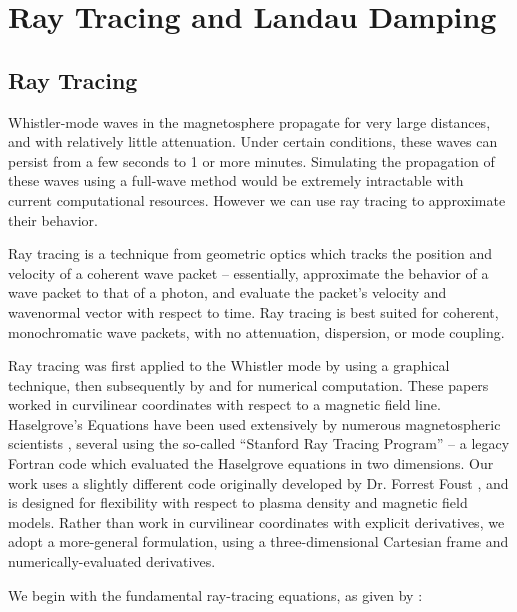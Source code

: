 \section{Ray Tracing and Landau Damping}
\label{section:raytracing}
\subsection{Ray Tracing}
Whistler-mode waves in the magnetosphere propagate for very large distances, and with relatively little attenuation. Under certain conditions, these waves can persist from a few seconds to 1 or more minutes. Simulating the propagation of these waves using a full-wave method would be extremely intractable with current computational resources. However we can use ray tracing to approximate their behavior.

Ray tracing is a technique from geometric optics which tracks the position and velocity of a coherent wave packet -- essentially, approximate the behavior of a wave packet to that of a photon, and evaluate the packet's velocity and wavenormal vector with respect to time. Ray tracing is best suited for coherent, monochromatic wave packets, with no attenuation, dispersion, or mode coupling. 

Ray tracing was first applied to the Whistler mode by \cite{Haselgrove1955} using a graphical technique, then subsequently by \cite{Haselgrove1960} and \cite{Kimura1966} for numerical computation. These papers worked in curvilinear coordinates with respect to a magnetic field line. Haselgrove's Equations have been used extensively by numerous magnetospheric scientists \citep{Kimura1966, Edgar1972, Ngo1989,Ristic1993, Lauben1998, B.Peter2007, Bortnik2005, Kulkarni2009}, several using the so-called ``Stanford Ray Tracing Program'' -- a legacy Fortran code which evaluated the Haselgrove equations in two dimensions. Our work uses a slightly different code originally developed by Dr. Forrest Foust \citep{Golden2010}, and is designed for flexibility with respect to plasma density and magnetic field models. Rather than work in curvilinear coordinates with explicit derivatives, we adopt a more-general formulation, using a three-dimensional Cartesian frame and numerically-evaluated derivatives.

We begin with the fundamental ray-tracing equations, as given by \cite{Haselgrove1960, Stix1992}:

